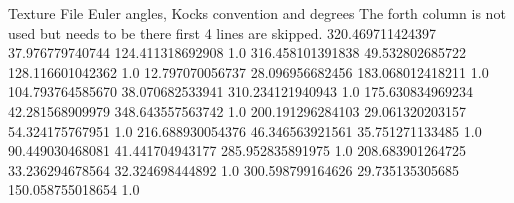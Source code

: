 Texture File
Euler angles, Kocks convention and degrees
The forth column is not used but needs to be there
first 4 lines are skipped. 
320.469711424397   37.976779740744  124.411318692908 1.0
316.458101391838   49.532802685722  128.116601042362 1.0
 12.797070056737   28.096956682456  183.068012418211 1.0
104.793764585670   38.070682533941  310.234121940943 1.0
175.630834969234   42.281568909979  348.643557563742 1.0
200.191296284103   29.061320203157   54.324175767951 1.0
216.688930054376   46.346563921561   35.751271133485 1.0
 90.449030468081   41.441704943177  285.952835891975 1.0
208.683901264725   33.236294678564   32.324698444892 1.0
300.598799164626   29.735135305685  150.058755018654 1.0
